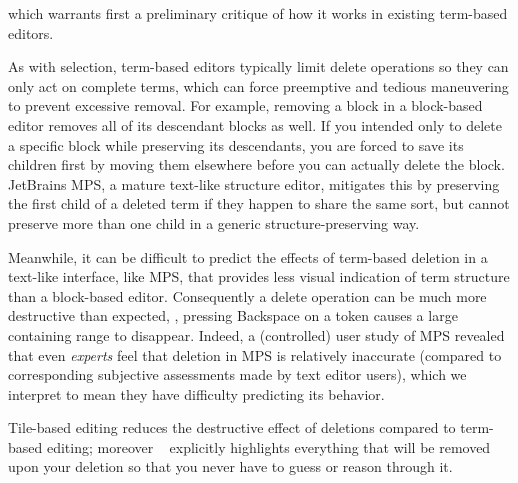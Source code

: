 \vspace{0.5cm}



which warrants first a preliminary critique of how it
works in existing term-based editors.

As with selection, term-based editors typically
limit delete operations so they can only act on
complete terms, which can force preemptive and tedious
maneuvering to prevent excessive removal.
For example, removing a block in a block-based editor
removes all of its descendant blocks as well.
If you intended only to delete a specific block
while preserving its descendants, you are forced
to save its children first by moving them elsewhere
before you can actually delete the block.
JetBrains MPS, a mature text-like structure editor,
mitigates this by preserving the first child of a deleted term
if they happen to share the same sort,
but cannot preserve more than one child in a generic
structure-preserving way.

Meanwhile, it can be difficult to predict the
effects of term-based deletion in a text-like
interface, like MPS, that provides less visual
indication of term structure than a block-based editor.
Consequently a delete operation can be much
more destructive than expected, \eg,
pressing Backspace on a token
causes a large containing range to disappear.
Indeed, a (controlled) user study of MPS revealed
that even \emph{experts} feel that deletion in MPS
is relatively inaccurate (compared to corresponding
subjective assessments made by text editor users),
which we interpret to mean they have difficulty
predicting its behavior.


Tile-based editing reduces the destructive effect of deletions
compared to term-based editing; moreover \tylr~ explicitly
highlights everything that will be removed upon your deletion
so that you never have to guess or reason through it.





